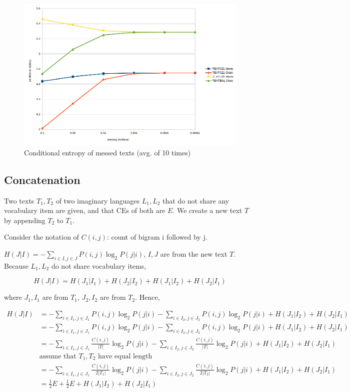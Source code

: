 \documentclass{article}
\begin{document}
\begin{figure}[h]
    \includegraphics[width=\textwidth]{task1-messup.png}
    \caption{Conditional entropy of messed texts (avg. of 10 times)}
    \label{fig:task1-messed}
\end{figure}

\subsection{Concatenation}

Two texts $T_1,T_2$ of two imaginary languages $L_1,L_2$ that do not share any vocabulary item are given, and that CEs of both are $E$. We create a new text $T$ by appending $T_2$ to $T_1$.

Consider the notation of $C(i,j)$: count of bigram i followed by j.

$H(J|I)=-\sum_{i\in I,j\in J}P(i,j)\log_2 P(j|i)$, $I,J$ are from the new text $T$. Because $L_1,L_2$ do not share vocabulary items,

\[H(J|I)=H(J_1|I_1)+H(J_2|I_2)+H(J_1|I_2)+H(J_2|I_1)\]

where $J_1,I_1$ are from $T_1$, $J_2,I_2$ are from $T_2$. Hence,

\begin{equation*}
    \begin{split}
    H(J|I) & =-\sum_{i\in I_1,j\in J_1}P(i,j)\log_2 P(j|i)-\sum_{i\in I_2,j\in J_2}P(i,j)\log_2 P(j|i)+H(J_1|I_2)+H(J_2|I_1) \\
    & =-\sum_{i\in I_1,j\in J_1}P(i,j)\log_2 P(j|i)-\sum_{i\in I_2,j\in J_2}P(i,j)\log_2 P(j|i)+H(J_1|I_2)+H(J_2|I_1) \\
    & =-\sum_{i\in I_1,j\in J_1}\frac{C(i,j)}{|T|}\log_2 P(j|i)-\sum_{i\in I_2,j\in J_2}\frac{C(i,j)}{|T|}\log_2 P(j|i)+H(J_1|I_2)+H(J_2|I_1) \\
    & \text{assume that } T_1, T_2 \text{ have equal length} \\
    & =-\sum_{i\in I_1,j\in J_1}\frac{C(i,j)}{2|T_1|}\log_2 P(j|i)-\sum_{i\in I_2,j\in J_2}\frac{C(i,j)}{2|T_2|}\log_2 P(j|i)+H(J_1|I_2)+H(J_2|I_1) \\
    & =\frac{1}{2}E+\frac{1}{2}E+H(J_1|I_2)+H(J_2|I_1) \\
    \end{split}
\end{equation*}
\end{document}
